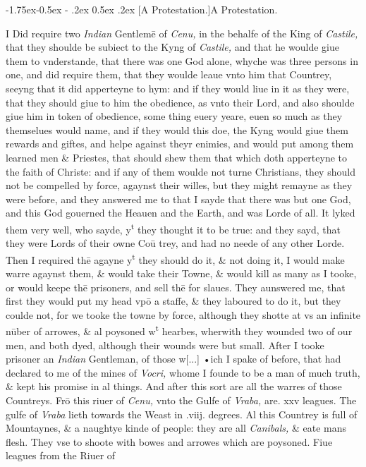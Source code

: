 \documentclass[11pt,twoside]{article}\makeatletter
\makeatletter
\def\gap{}
\renewcommand\subsection{\@startsection{subsection}{2}{\z@}%
     {-1.75ex\@plus -0.5ex \@minus- .2ex}%
     {0.5ex \@plus .2ex}%
     {\reset@font\Large\sffamily}}
\makeatother
\begin{document}
\subsection[{A Protestation.}]{A Protestation.}\par
I Did require two {\itshape Indian} Gentlemē of {\itshape Cenu,} in the behalfe of the King of {\itshape Castile,} that they shoulde be subiect to the Kyng of {\itshape Castile,} and that he woulde giue them to vnderstande, that there was one God alone, whyche was three persons in one, and did require them, that they woulde leaue vnto him that Countrey, seeyng that it did apperteyne to hym: and if they would liue in it as they were, that they should giue to him the obedience, as vnto their Lord, and also shoulde giue him in to­ken of obedience, some thing euery yeare, euen so much as they themselues would name, and if they would this doe, the Kyng would giue them rewards and giftes, and helpe against theyr enimies, and would put among them learned men \& Priestes, that should shew them that which doth apperteyne to the faith of Christe: and if any of them woulde not turne Christians, they should not be compelled by force, agaynst their willes, but they might remayne as they were before, and they answe­red me to that I sayde that there was but one God, and this God gouerned the Heauen and the Earth, and was Lorde of %
 all. It lyked them very well, who sayde, y\textsuperscript{t} they thought it to be true: and they sayd, that they were Lords of their owne Coū ­trey, and had no neede of any other Lorde. Then I required thē agayne y\textsuperscript{t} they should do it, \& not doing it, I would make warre agaynst them, \& would take their Towne, \& would kill as many as I tooke, or would keepe thē prisoners, and sell thē for slaues. They aunswered me, that first they would put my head vpō a staffe, \& they laboured to do it, but they coulde not, for we tooke the towne by force, although they shotte at vs an infinite nūber of arrowes, \& al poysoned w\textsuperscript{t} hearbes, wherwith they wounded two of our men, and both dyed, although their wounds were but small. After I tooke prisoner an {\itshape Indian} Gentleman, of those w[...] {\gap •}ich I spake of before, that had declared to me of the mines of {\itshape Vocri,} whome I founde to be a man of much truth, \& kept his promise in al things. And after this sort are all the warres of those Countreys. Frō this riuer of {\itshape Cenu,} vnto the Gulfe of {\itshape Vraba,} are. xxv leagues. The gulfe of {\itshape Vraba} lieth towards the Weast in .viij. degrees. Al this Countrey is full of Mountaynes, \& a naughtye kinde of people: they are all {\itshape Canibals,} \& eate mans flesh. They vse to shoote with bowes and arrowes which are poysoned. Fiue leagues from the Riuer of 
\end{document}
